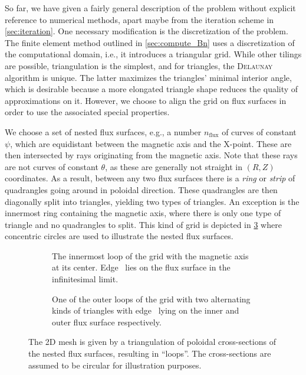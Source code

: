 So far, we have given a fairly general description of the problem without explicit reference to numerical methods, apart maybe from the iteration scheme in \cref{sec:iteration}. One necessary modification is the discretization of the problem. The finite element method outlined in \cref{sec:compute_Bn} uses a discretization of the computational domain, i.e., it introduces a triangular grid. While other tilings are possible, triangulation is the simplest, and for triangles, the \textsc{Delaunay} algorithm is unique. The latter maximizes the triangles' minimal interior angle, which is desirable because a more elongated triangle shape reduces the quality of approximations on it. However, we choose to align the grid on flux surfaces in order to use the associated special properties.

We choose a set of nested flux surfaces, e.g., a number $n_{\text{flux}}$ of curves of constant $\psi$, which are equidistant between the magnetic axis and the X-point. These are then intersected by rays originating from the magnetic axis. Note that these rays are not curves of constant $\theta$, as these are generally not straight in $(R, Z)$ coordinates. As a result, between any two flux surfaces there is a \emph{ring} or \emph{strip} of quadrangles going around in poloidal direction. These quadrangles are then diagonally split into triangles, yielding two types of triangles. An exception is the innermost ring containing the magnetic axis, where there is only one type of triangle and no quadrangles to split. This kind of grid is depicted in \cref{fig:grid} where concentric circles are used to illustrate the nested flux surfaces.
\begin{figure}[bth]
  \centering
  \begin{subfigure}[b]{0.33\textwidth}
    \centering
    
    \caption{The innermost loop of the grid with the magnetic axis at its center. Edge \fs\ lies on the flux surface in the infinitesimal limit.}
    \label{fig:grid0}
  \end{subfigure}
  \quad
  \begin{subfigure}[b]{0.5\textwidth}
    \centering
    
    \caption{One of the outer loops of the grid with two alternating kinds of triangles with edge \fs\ lying on the inner and outer flux surface respectively.}
    \label{fig:grid1}
  \end{subfigure}
  \caption{The 2D mesh is given by a triangulation of poloidal cross-sections of the nested flux surfaces, resulting in \enquote{loops}. The cross-sections are assumed to be circular for illustration purposes.}
  \label{fig:grid}
\end{figure}

